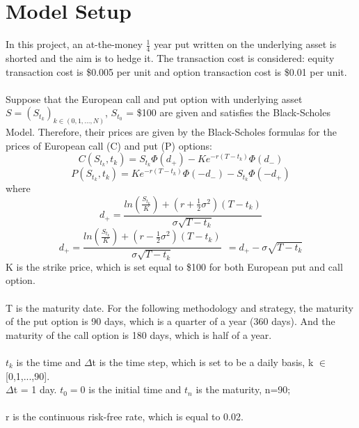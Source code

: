 \documentclass[12pt]{article}
\begin{document}
\section{Model Setup}
In this project, an at-the-money $\frac{1}{4}$ year put written on the underlying asset is shorted and the aim is to hedge it. The transaction cost is considered: equity transaction cost is \$0.005 per unit and option transaction cost is \$0.01 per unit.\\
\\Suppose that the European call and put option with underlying asset $S=(S_{t_k})_{k \in (0,1,...,N)}$, $S_{t_0}$ = \$100 are given and satisfies the Black-Scholes Model. Therefore, their prices are given by the Black-Scholes formulas for the prices of European call (C) and put (P) options:
\begin{equation}
    C({S_{t_k}},{t_k}) = {S_{t_k}} {\Phi(d_+)} - K {e^{-r(T-{t_k})}} {\Phi(d_-)}
\end{equation}
\begin{equation}
    P({S_{t_k}},{t_k}) = K {e^{-r(T-{t_k})}} {\Phi(-d_-)} - {S_{t_k}} {\Phi(-d_+)}
\end{equation}
where
\begin{equation}
    {d_+} = \frac{ln({\frac{{S_{t_k}}}{K}}) + (r+{\frac{1}{2}}{\sigma^2})(T-{t_k})}   
    {{\sigma}{\sqrt{T-{t_k}}}}
\end{equation}
\begin{equation}
    {d_+} = \frac{ln({\frac{{S_{t_k}}}{K}}) + (r-{\frac{1}{2}}{\sigma^2})(T-{t_k})}   
    {{\sigma}{\sqrt{T-{t_k}}}}
    ~~
    ={d_+} - {{\sigma}{\sqrt{T-{t_k}}}}
\end{equation}
K is the strike price, which is set equal to \$100 for both European put and call option.\\
\\T is the maturity date. For the following methodology and strategy, the maturity of the put option is 90 days, which is a quarter of a year (360 days). And the maturity of the call option is 180 days, which is half of a year.\\
\\${t_k}$ is the time and ${\Delta}$t is the time step, which is set to be a daily basis, k $\in$ [0,1,...,90].\\
${\Delta}$t = 1 day. $t_0=0$ is the initial time and $t_n$ is the maturity, n=90;\\
\\r is the continuous risk-free rate, which is equal to 0.02.\\
\end{document}
